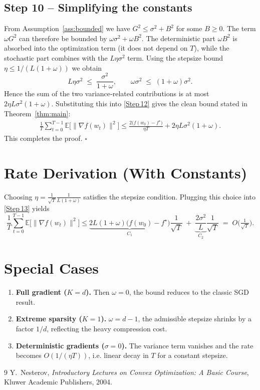 \documentclass{article}
\newcommand{\E}{\mathbb{E}}
\begin{document}
\subsection*{Step 10 – Simplifying the constants}
From Assumption~\ref{ass:bounded} we have $G^{2}\le\sigma^{2}+B^{2}$ for some $B\ge0$.  
The term $\omega G^{2}$ can therefore be bounded by $\omega\sigma^{2}+ \omega B^{2}$.  
The deterministic part $\omega B^{2}$ is absorbed into the optimization term (it does not depend on $T$), while the stochastic part combines with the $L\eta\sigma^{2}$ term.  Using the stepsize bound $\eta\le 1/(L(1+\omega))$ we obtain
\[
L\eta\sigma^{2}\;\le\;\frac{\sigma^{2}}{1+\omega},
\qquad
\omega\sigma^{2}\;\le\;(1+\omega)\sigma^{2}.
\]
Hence the sum of the two variance‑related contributions is at most $2\eta L\sigma^{2}(1+\omega)$.  Substituting this into \eqref{Step 12} gives the clean bound stated in Theorem~\ref{thm:main}:
\begin{align}
\frac{1}{T}\sum_{t=0}^{T-1}\E\!\big[\|\nabla f(w_t)\|^{2}\big]
\le
\frac{2\big(f(w_0)-f^{\star}\big)}{\eta T}
   +2\eta L\sigma^{2}(1+\omega).
\tag{Step 13}
\end{align}
This completes the proof. $\square$

\section*{Rate Derivation (With Constants)}
Choosing $\displaystyle\eta = \frac{1}{\sqrt{T}}\frac{1}{L(1+\omega)}$ satisfies the stepsize condition.  Plugging this choice into \eqref{Step 13} yields
\[
\frac{1}{T}\sum_{t=0}^{T-1}\E\!\big[\|\nabla f(w_t)\|^{2}\big]
\le
\underbrace{2L(1+\omega)\big(f(w_0)-f^{\star}\big)}_{C_{1}}\frac{1}{\sqrt{T}}
\;+\;
\underbrace{\frac{2\sigma^{2}}{L}}_{C_{2}}\frac{1}{\sqrt{T}}
\;=\;O\!\big(\tfrac{1}{\sqrt{T}}\big).
\]

\section*{Special Cases}
\begin{enumerate}[leftmargin=*,labelsep=5mm]
\item \textbf{Full gradient ($K=d$).} Then $\omega=0$, the bound reduces to the classic SGD result.
\item \textbf{Extreme sparsity ($K=1$).} $\omega=d-1$, the admissible stepsize shrinks by a factor $1/d$, reflecting the heavy compression cost.
\item \textbf{Deterministic gradients ($\sigma=0$).} The variance term vanishes and the rate becomes $O(1/(\eta T))$, i.e. linear decay in $T$ for a constant stepsize.
\end{enumerate}

\begin{thebibliography}{9}
Y.~Nesterov, \emph{Introductory Lectures on Convex Optimization: A Basic Course}, Kluwer Academic Publishers, 2004.
\end{thebibliography}
\end{document}

